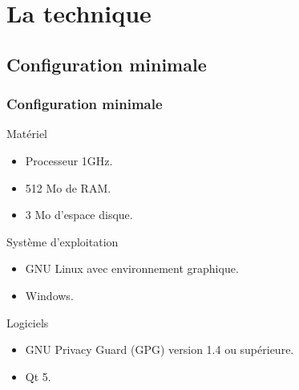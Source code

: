 \section{La technique}
\subsection{Configuration minimale}
\begin{frame}
  \frametitle{\color{white} Configuration minimale}
  \begin{block}{Matériel}
    \begin{itemize}
      \item Processeur 1GHz.
      \item 512 Mo de RAM.
      \item 3 Mo d'espace disque.
    \end{itemize}
  \end{block}
  \begin{block}{Système d'exploitation}
    \begin{itemize}
      \item GNU Linux avec environnement graphique.
      \item Windows.
    \end{itemize}
  \end{block}
  \begin{block}{Logiciels}
    \begin{itemize}
      \item GNU Privacy Guard (GPG) version 1.4 ou supérieure.
      \item Qt 5.
    \end{itemize}
  \end{block}
\end{frame}

